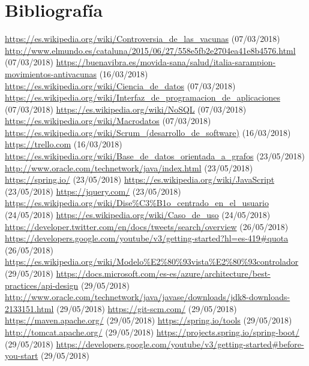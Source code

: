 \documentclass[11pt,a4paper]{article}
\begin{document}
\section{Bibliografía}
\bigskip

\begin{thebibliography}{0}
   \url{https://es.wikipedia.org/wiki/Controversia_de_las_vacunas} (07/03/2018)
   \url{http://www.elmundo.es/cataluna/2015/06/27/558e5fb2e2704ea41e8b4576.html} (07/03/2018)
   \url{https://buenavibra.es/movida-sana/salud/italia-sarampion-movimientos-antivacunas} (16/03/2018)
   \url{https://es.wikipedia.org/wiki/Ciencia_de_datos} (07/03/2018)
   \url{https://es.wikipedia.org/wiki/Interfaz_de_programacion_de_aplicaciones} (07/03/2018)
   \url{https://es.wikipedia.org/wiki/NoSQL} (07/03/2018)
   \url{https://es.wikipedia.org/wiki/Macrodatos} (07/03/2018)
   \url{https://es.wikipedia.org/wiki/Scrum_(desarrollo_de_software)} (16/03/2018)
   \url{https://trello.com} (16/03/2018)
   \url{https://es.wikipedia.org/wiki/Base_de_datos_orientada_a_grafos} (23/05/2018)
   \url{http://www.oracle.com/technetwork/java/index.html} (23/05/2018)
   \url{https://spring.io/} (23/05/2018)
   \url{https://es.wikipedia.org/wiki/JavaScript} (23/05/2018)
   \url{https://jquery.com/} (23/05/2018)
   \url{https://es.wikipedia.org/wiki/Dise%C3%B1o_centrado_en_el_usuario} (24/05/2018)
   \url{https://es.wikipedia.org/wiki/Caso_de_uso} (24/05/2018) 
   \url{https://developer.twitter.com/en/docs/tweets/search/overview} (26/05/2018) 
   \url{https://developers.google.com/youtube/v3/getting-started?hl=es-419#quota} (26/05/2018) 
   \url{https://es.wikipedia.org/wiki/Modelo%E2%80%93vista%E2%80%93controlador} (29/05/2018) 
   \url{https://docs.microsoft.com/es-es/azure/architecture/best-practices/api-design} (29/05/2018) 
   \url{http://www.oracle.com/technetwork/java/javase/downloads/jdk8-downloads-2133151.html} (29/05/2018) 
   \url{https://git-scm.com/} (29/05/2018) 
   \url{https://maven.apache.org/} (29/05/2018) 
   \url{https://spring.io/tools} (29/05/2018) 
   \url{http://tomcat.apache.org/} (29/05/2018) 
   \url{https://projects.spring.io/spring-boot/} (29/05/2018) 
   \url{https://developers.google.com/youtube/v3/getting-started#before-you-start} (29/05/2018) 
\end{thebibliography}
\newpage 
\end{document}
